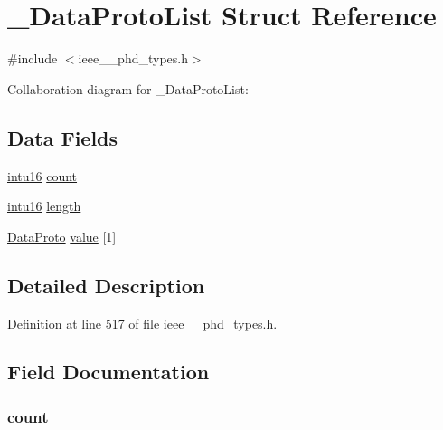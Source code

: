 \hypertarget{struct___data_proto_list}{}\section{\+\_\+\+Data\+Proto\+List Struct Reference}
\label{struct___data_proto_list}


{\ttfamily \#include $<$ieee\+\_\+\_\+phd\+\_\+types.\+h$>$}



Collaboration diagram for \+\_\+\+Data\+Proto\+List\+:
\subsection*{Data Fields}
\begin{DoxyCompactItemize}
\item 
\hyperlink{ieee__11073__phd__types_8h_a3561595d2aa7416532e1c9910abd076d}{intu16} \hyperlink{struct___data_proto_list_abf6db060ae8e224764b0f867fb135ecd}{count}
\item 
\hyperlink{ieee__11073__phd__types_8h_a3561595d2aa7416532e1c9910abd076d}{intu16} \hyperlink{struct___data_proto_list_a3743679e4ff85e3e1b3fc2e59973fbb3}{length}
\item 
\hyperlink{ieee__11073__phd__types_8h_a53b4378eb73bafac24f4b68bf1ca1b7e}{Data\+Proto} \hyperlink{struct___data_proto_list_a137c5e2482cc858ede4329b876618963}{value} \mbox{[}1\mbox{]}
\end{DoxyCompactItemize}


\subsection{Detailed Description}


Definition at line 517 of file ieee\+\_\+\_\+phd\+\_\+types.\+h.



\subsection{Field Documentation}
\hypertarget{struct___data_proto_list_abf6db060ae8e224764b0f867fb135ecd}{}
\subsubsection[{count}]{ count}\label{struct___data_proto_list_abf6db060ae8e224764b0f867fb135ecd}



